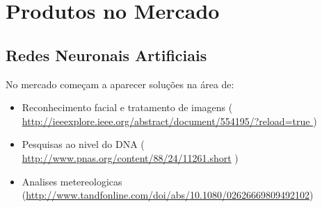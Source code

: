 \section{Produtos no Mercado}\label{sec:Products}




\subsection{Redes Neuronais Artificiais}
No mercado começam a aparecer soluções na área de:
\begin{itemize}
\item Reconhecimento facial e tratamento de imagens 
(\url{ http://ieeexplore.ieee.org/abstract/document/554195/?reload=true }) 

\item Pesquisas ao nivel do DNA 
(\url{ http://www.pnas.org/content/88/24/11261.short} )

\item Analises metereologicas (\url{http://www.tandfonline.com/doi/abs/10.1080/02626669809492102}) 

\end{itemize}












